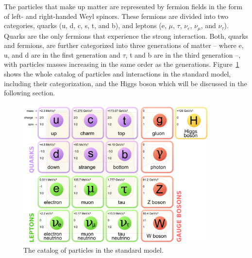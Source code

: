 The particles that make up matter are represented by fermion fields in
the form of left- and right-handed Weyl spinors. These fermions are
divided into two categories, quarks (u, d, c, s, t, and b), and
leptons (e, $\mu$, $\tau$, $\nu_{e}$, $\nu_{\mu}$, and
$\nu_{\tau}$). Quarks are the only fermions that experience the strong
interaction. Both, quarks and fermions, are further categorized into
three generations of matter -- where e, u, and d are in the first
generation and $\tau$, t and b are in the third generation --, with
particles masses increasing in the same order as the
generations. Figure~\ref{fig:SMcartoon} shows the whole catalog of
particles and interactions in the standard model, including their
categorization, and the Higgs boson which will be discussed in the
following section.
\begin{figure}
 \centering
\includegraphics[width=0.9\textwidth]{IntroFigures/TheSM.png}
 \caption{The catalog of particles in the standard model.\label{fig:SMcartoon}}
\end{figure}

